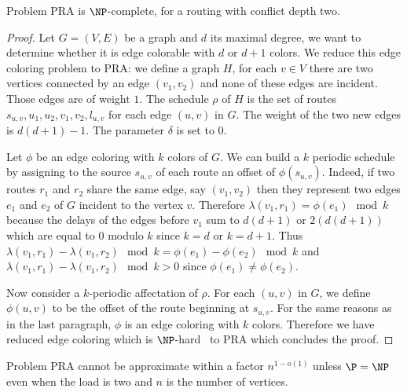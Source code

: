 \documentclass{article}
\begin{document}


\begin{proposition}
Problem PRA is $\NP$-complete, for a routing with conflict depth two.
\end{proposition}
 \begin{proof}
  Let $G=(V,E)$ be a graph and $d$ its maximal degree, we want to determine whether it is edge colorable
  with $d$ or $d+1$ colors. We reduce this edge coloring problem to PRA: we define a graph $H$, for each 
  $v \in V$ there are two vertices connected by an edge $(v_1,v_2)$ and none of these edges are incident.
  Those edges are of weight $1$.
  The schedule $\rho$ of $H$ is the set of routes $s_{u,v},u_1,u_2,v_1,v_2,l_{u,v}$ for each edge $(u,v)$ in $G$. The weight of  
  the two new edges is $d(d+1)-1$. The parameter $\delta$ is set to $0$.
  
  Let $\phi$ be an edge coloring with $k$ colors of $G$. We can build a $k$ periodic schedule 
  by assigning to the source $s_{u,v}$ of each route an offset  of $\phi(s_{u,v})$. Indeed, 
  if two routes $r_1$ and $r_2$ share the same edge, say $(v_1,v_2)$ then they represent two edges $e_1$ and $e_2$ of $G$ incident  
  to the vertex $v$. Therefore $\lambda(v_1,r_1) = \phi(e_1) \mod k$ because the delays of the edges before $v_1$ sum to $d(d+1)$ or 
  $2(d(d+1))$ which are equal to $0$ modulo $k$ since $k=d$ or $k=d+1$. Thus $\lambda(v_1,r_1) - \lambda(v_1,r_2) \mod k = \phi(e_1) - \phi(e_2) \mod k$
  and $\lambda(v_1,r_1) - \lambda(v_1,r_2) \mod k > 0$ since $\phi(e_1) \neq \phi(e_2) $.
  
  Now consider a $k$-periodic affectation of $\rho$. For each $(u,v)$ in $G$, we define $\phi(u,v)$ to be the offset of the route
  beginning at $s_{u,v}$. For the same reasons as in the last paragraph, $\phi$ is an edge coloring with $k$ colors.
  Therefore we have reduced edge coloring which is $\NP$-hard~\cite{holyer1981np} to PRA which concludes the proof. 
 \end{proof}


\begin{theorem}
 Problem PRA cannot be approximate within a factor $n^{1-o(1)}$ unless $\P = \NP$ even when the load is two
 and $n$ is the number of vertices.
\end{theorem}
\end{document}
